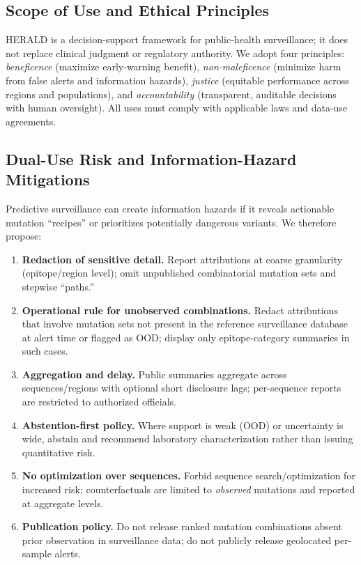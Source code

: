 \documentclass[11pt]{article}
\begin{document}
\subsection{Scope of Use and Ethical Principles}
HERALD is a decision-support framework for public-health surveillance; it does not replace clinical judgment or regulatory authority. We adopt four principles: \emph{beneficence} (maximize early-warning benefit), \emph{non-maleficence} (minimize harm from false alerts and information hazards), \emph{justice} (equitable performance across regions and populations), and \emph{accountability} (transparent, auditable decisions with human oversight). All uses must comply with applicable laws and data-use agreements.

\subsection{Dual-Use Risk and Information-Hazard Mitigations}
\label{sec:dualuse}
Predictive surveillance can create information hazards if it reveals actionable mutation “recipes” or prioritizes potentially dangerous variants. We therefore propose:
\begin{enumerate}[leftmargin=*, itemsep=2pt, topsep=2pt]
\item \textbf{Redaction of sensitive detail.} Report attributions at coarse granularity (epitope/region level); omit unpublished combinatorial mutation sets and stepwise “paths.”
\item \textbf{Operational rule for unobserved combinations.} Redact attributions that involve mutation sets not present in the reference surveillance database at alert time or flagged as OOD; display only epitope-category summaries in such cases.
\item \textbf{Aggregation and delay.} Public summaries aggregate across sequences/regions with optional short disclosure lags; per-sequence reports are restricted to authorized officials.
\item \textbf{Abstention-first policy.} Where support is weak (OOD) or uncertainty is wide, abstain and recommend laboratory characterization rather than issuing quantitative risk.
\item \textbf{No optimization over sequences.} Forbid sequence search/optimization for increased risk; counterfactuals are limited to \emph{observed} mutations and reported at aggregate levels.
\item \textbf{Publication policy.} Do not release ranked mutation combinations absent prior observation in surveillance data; do not publicly release geolocated per-sample alerts.
\end{enumerate}
\end{document}
